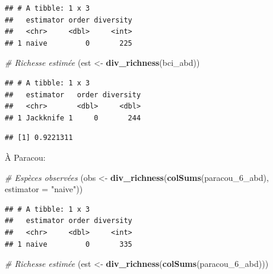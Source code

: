 \documentclass[
  11pt,
  american,
  a4paper,
  extrafontsizes,onecolumn,openright
  ]{memoir}
\newenvironment{Shaded}{\begin{snugshade}}{\end{snugshade}}
\newcommand{\AttributeTok}[1]{\textcolor[rgb]{0.13,0.29,0.53}{#1}}
\newcommand{\CommentTok}[1]{\textcolor[rgb]{0.56,0.35,0.01}{\textit{#1}}}
\newcommand{\FunctionTok}[1]{\textcolor[rgb]{0.13,0.29,0.53}{\textbf{#1}}}
\newcommand{\NormalTok}[1]{#1}
\newcommand{\OtherTok}[1]{\textcolor[rgb]{0.56,0.35,0.01}{#1}}
\newcommand{\SpecialCharTok}[1]{\textcolor[rgb]{0.81,0.36,0.00}{\textbf{#1}}}
\newcommand{\StringTok}[1]{\textcolor[rgb]{0.31,0.60,0.02}{#1}}
\begin{document}
\begin{verbatim}
## # A tibble: 1 x 3
##   estimator order diversity
##   <chr>     <dbl>     <int>
## 1 naive         0       225
\end{verbatim}

\begin{Shaded}
\begin{Highlighting}[]
\CommentTok{\# Richesse estimée}
\NormalTok{(est }\OtherTok{\textless{}{-}} \FunctionTok{div\_richness}\NormalTok{(bci\_abd))}
\end{Highlighting}
\end{Shaded}

\begin{verbatim}
## # A tibble: 1 x 3
##   estimator   order diversity
##   <chr>       <dbl>     <dbl>
## 1 Jackknife 1     0       244
\end{verbatim}

\begin{Shaded}
\end{Shaded}

\begin{verbatim}
## [1] 0.9221311
\end{verbatim}

\normalsize

À Paracou:

\scriptsize

\begin{Shaded}
\begin{Highlighting}[]
\CommentTok{\# Espèces observées}
\NormalTok{(obs }\OtherTok{\textless{}{-}} \FunctionTok{div\_richness}\NormalTok{(}\FunctionTok{colSums}\NormalTok{(paracou\_6\_abd), }\AttributeTok{estimator  =} \StringTok{"naive"}\NormalTok{))}
\end{Highlighting}
\end{Shaded}

\begin{verbatim}
## # A tibble: 1 x 3
##   estimator order diversity
##   <chr>     <dbl>     <int>
## 1 naive         0       335
\end{verbatim}

\begin{Shaded}
\begin{Highlighting}[]
\CommentTok{\# Richesse estimée}
\NormalTok{(est }\OtherTok{\textless{}{-}} \FunctionTok{div\_richness}\NormalTok{(}\FunctionTok{colSums}\NormalTok{(paracou\_6\_abd)))}
\end{Highlighting}
\end{Shaded}
\end{document}
